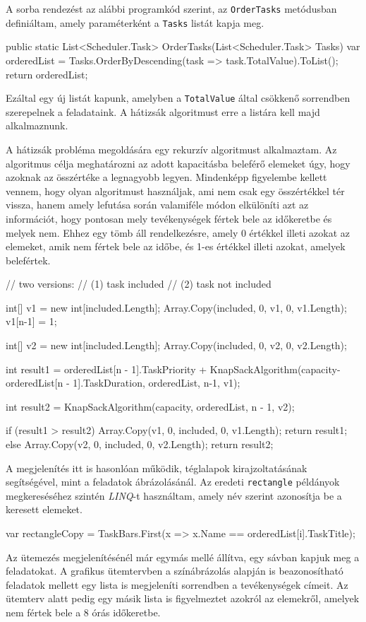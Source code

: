 A sorba rendezést az alábbi programkód szerint, az \texttt{OrderTasks} metódusban definiáltam, amely paraméterként a \texttt{Tasks} listát kapja meg.
\begin{java}
public static List<Scheduler.Task>
OrderTasks(List<Scheduler.Task> Tasks)
{
  var orderedList =
    Tasks.OrderByDescending(task => task.TotalValue).ToList();
  return orderedList;
}
\end{java}
Ezáltal egy új listát kapunk, amelyben a \texttt{TotalValue} által csökkenő sorrendben szerepelnek a feladataink. A hátizsák algoritmust erre a listára kell majd alkalmaznunk.


A hátizsák probléma megoldására egy rekurzív algoritmust alkalmaztam. Az algoritmus célja meghatározni az adott kapacitásba beleférő elemeket úgy, hogy  azoknak az összértéke a legnagyobb legyen. Mindenképp figyelembe kellett vennem, hogy olyan algoritmust használjak, ami nem csak egy összértékkel tér vissza, hanem amely lefutása során valamiféle módon elkülöníti azt az információt, hogy pontosan mely tevékenységek fértek bele az időkeretbe és melyek nem. Ehhez egy tömb áll rendelkezésre, amely 0 értékkel illeti azokat az elemeket, amik nem fértek bele az időbe, és 1-es értékkel illeti azokat, amelyek belefértek.
\begin{java}
// two versions:
// (1) task included
// (2) task not included

int[] v1 = new int[included.Length];
Array.Copy(included, 0, v1, 0, v1.Length);
v1[n-1] = 1;
	
int[] v2 = new int[included.Length];
Array.Copy(included, 0, v2, 0, v2.Length);
	
int result1 = orderedList[n - 1].TaskPriority
+ KnapSackAlgorithm(capacity-orderedList[n - 1].TaskDuration,
                    orderedList, n-1, v1);

int result2 =
    KnapSackAlgorithm(capacity, orderedList, n - 1, v2);
	
if (result1 > result2)
{
    Array.Copy(v1, 0, included, 0, v1.Length);
    return result1;
}
else
{
    Array.Copy(v2, 0, included, 0, v2.Length);
    return result2;
}
\end{java}


A megjelenítés itt is hasonlóan működik, téglalapok kirajzoltatásának segítségével, mint a feladatok ábrázolásánál. Az eredeti \texttt{rectangle} példányok megkereséséhez szintén \textit{LINQ}-t használtam, amely név szerint azonosítja be a keresett elemeket.
\begin{java}
var rectangleCopy =
  TaskBars.First(x => x.Name == orderedList[i].TaskTitle);
\end{java}
Az ütemezés megjelenítésénél már egymás mellé állítva, egy sávban kapjuk meg a feladatokat. A grafikus ütemtervben a színábrázolás alapján is beazonosítható feladatok mellett egy lista is megjeleníti sorrendben a tevékenységek címeit. Az ütemterv alatt pedig egy másik lista is figyelmeztet azokról az elemekről, amelyek nem fértek bele a 8 órás időkeretbe.

